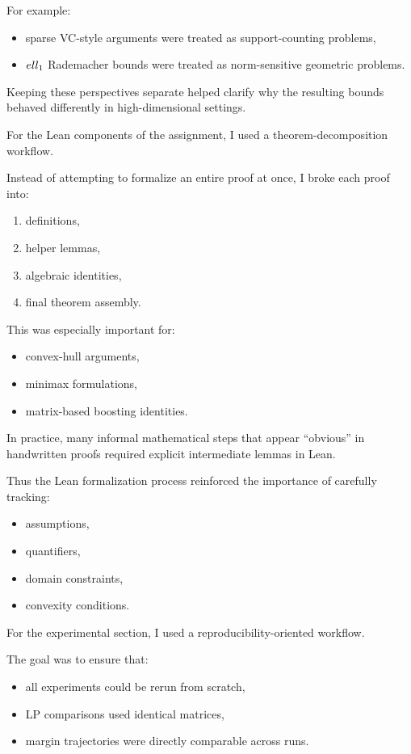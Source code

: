 \documentclass[11pt]{article}
\begin{document}
\begin{enumerate}
\begin{solutionbox}
For example:
\begin{itemize}
    \item sparse VC-style arguments were treated as support-counting problems,
    \item $\\ell_1$ Rademacher bounds were treated as norm-sensitive geometric problems.
\end{itemize}

Keeping these perspectives separate helped clarify why the resulting bounds behaved differently in high-dimensional settings.

\medskip

For the Lean components of the assignment, I used a theorem-decomposition workflow.

Instead of attempting to formalize an entire proof at once, I broke each proof into:
\begin{enumerate}
    \item definitions,
    \item helper lemmas,
    \item algebraic identities,
    \item final theorem assembly.
\end{enumerate}

This was especially important for:
\begin{itemize}
    \item convex-hull arguments,
    \item minimax formulations,
    \item matrix-based boosting identities.
\end{itemize}

In practice, many informal mathematical steps that appear ``obvious'' in handwritten proofs required explicit intermediate lemmas in Lean.

Thus the Lean formalization process reinforced the importance of carefully tracking:
\begin{itemize}
    \item assumptions,
    \item quantifiers,
    \item domain constraints,
    \item convexity conditions.
\end{itemize}

\medskip

For the experimental section, I used a reproducibility-oriented workflow.

The goal was to ensure that:
\begin{itemize}
    \item all experiments could be rerun from scratch,
    \item LP comparisons used identical matrices,
    \item margin trajectories were directly comparable across runs.
\end{itemize}


\end{solutionbox}
\end{enumerate}
\end{document}
